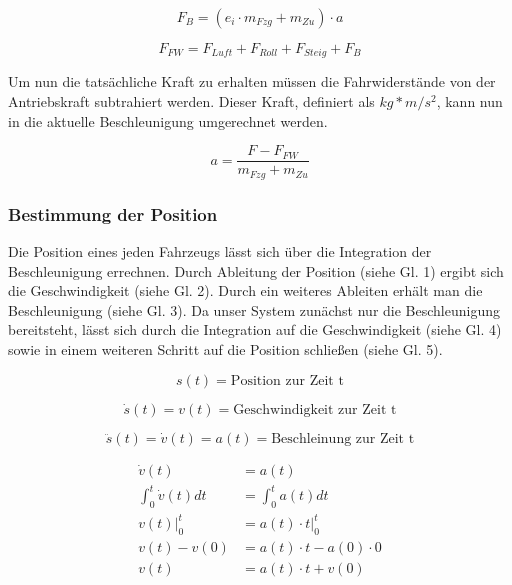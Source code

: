 \documentclass[12pt,a4paper,bibliography=totocnumbered,listof=totocnumbered, abstracton]{scrartcl}
\theoremstyle{Umgebung}
\begin{document}
\begin{equation}
 F_{B}=(e_{i}\cdot m_{Fzg} +m_{Zu}) \cdot a
\end{equation}

\begin{equation}
F_{FW} = F_{Luft} + F_{Roll} + F_{Steig} + F_{B}
\end{equation}

Um nun die tatsächliche Kraft zu erhalten müssen die Fahrwiderstände von der Antriebskraft subtrahiert werden. Dieser Kraft, definiert als $kg * m/s^2$, kann nun in die aktuelle Beschleunigung umgerechnet werden.

\begin{equation}
a = \frac{F - F_{FW}}{m_{Fzg} + m_{Zu}}
\end{equation}

\subsubsection{Bestimmung der Position}

Die Position eines jeden Fahrzeugs lässt sich über die Integration der Beschleunigung errechnen. Durch Ableitung der Position (siehe Gl. 1) ergibt sich die Geschwindigkeit (siehe Gl. 2). Durch ein weiteres Ableiten erhält man die Beschleunigung (siehe Gl. 3). Da unser System zunächst nur die Beschleunigung bereitsteht, lässt sich durch die Integration auf die Geschwindigkeit (siehe Gl. 4) sowie in einem weiteren Schritt auf die Position schließen (siehe Gl. 5).

\begin{equation}
	s(t) = \text{Position zur Zeit t}
\end{equation}

\begin{equation}
	\dot{s}(t) = v(t) = \text{Geschwindigkeit zur Zeit t}
\end{equation}

\begin{equation}
	\ddot{s}(t) = \dot{v}(t) = a(t) = \text{Beschleinung zur Zeit t}
\end{equation}

\begin{equation}
	\begin{aligned}
		\dot{v}(t)                 & = a(t)                        \\
		\int_{0}^{t} \dot{v}(t) dt & = \int_{0}^{t} a(t) dt        \\
		v(t)\Big|_0^t              & = a(t) \cdot t \Big|_0^t      \\
		v(t) - v(0)                & = a(t) \cdot t - a(0) \cdot 0 \\
		v(t)                       & = a(t) \cdot t + v(0)
	\end{aligned}
\end{equation}
\end{document}
